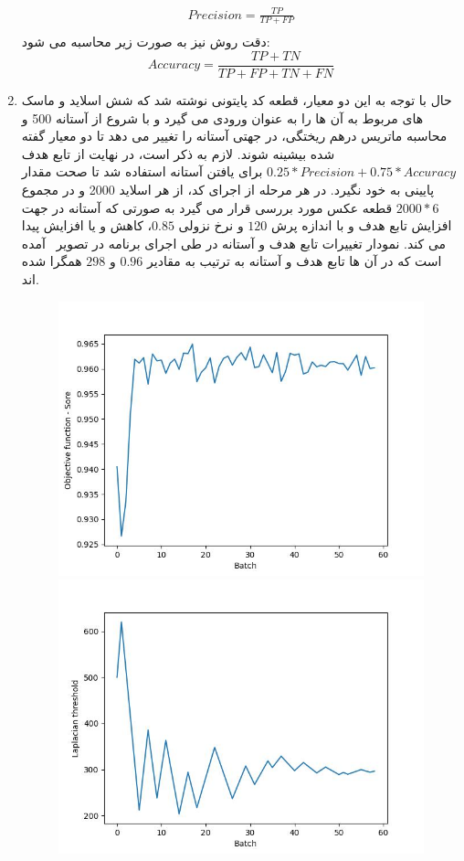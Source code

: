 \begin{enumerate}
\begin{gather*}
        Precision = \frac{TP}{TP + FP}\\
    \end{gather*}
    دقت روش نیز به صورت زیر محاسبه می شود:
    \[Accuracy = \frac{TP + TN}{TP + FP + TN + FN}\]
    \item حال با توجه به این دو معیار، قطعه کد پایتونی نوشته شد که شش اسلاید و ماسک های مربوط به آن ها را به عنوان ورودی می گیرد و با شروع از آستانه 500 و محاسبه ماتریس درهم ریختگی، در جهتی آستانه را تغییر می دهد تا دو معیار گفته شده بیشینه شوند.
    لازم به ذکر است، در نهایت از تابع هدف $0.25*Precision+0.75*Accuracy$ برای یافتن آستانه استفاده شد تا صحت مقدار پایینی به خود نگیرد.
    در هر مرحله از اجرای کد، از هر اسلاید 2000 و در مجموع $2000 * 6$ قطعه عکس مورد بررسی قرار می گیرد به صورتی که آستانه در جهت افزایش تابع هدف و با اندازه پرش $120$ و نرخ نزولی $0.85$، کاهش و یا افزایش پیدا می کند.
    نمودار تغییرات تابع هدف و آستانه در طی اجرای برنامه در تصویر~ آمده است که در آن ها تابع هدف و آستانه به ترتیب به مقادیر $0.96$ و $298$ همگرا شده اند.
    \begin{figure}
        \begin{center}
            \includegraphics[width=0.48\linewidth]{figs/introduction/subs/challenges/laplacian_threshold_score_history_chart.jpeg}
            \includegraphics[width=0.48\linewidth]{figs/introduction/subs/challenges/laplacian_threshold_history_chart.jpeg}
        \end{center}

\end{figure}
\end{enumerate}
